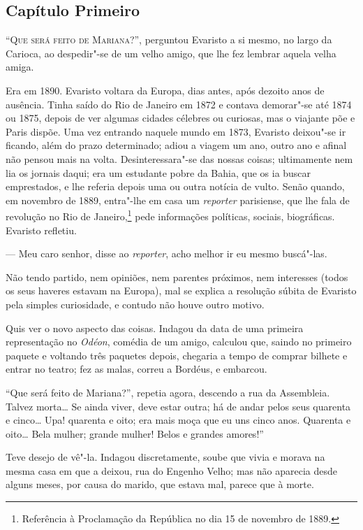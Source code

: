 \begin{linenumbers}

\section{Capítulo Primeiro}

\textsc{``Que será feito de Mariana?'',} perguntou Evaristo a si mesmo, no largo
da Carioca, ao despedir"-se de um velho amigo, que lhe fez lembrar aquela
velha amiga.

Era em 1890. Evaristo voltara da Europa, dias antes, após dezoito anos
de ausência. Tinha saído do Rio de Janeiro em 1872 e contava demorar"-se
até 1874 ou 1875, depois de ver algumas cidades célebres ou curiosas,
mas o viajante põe e Paris dispõe. Uma vez entrando naquele mundo em
1873, Evaristo deixou"-se ir ficando, além do prazo determinado; adiou a
viagem um ano, outro ano e afinal não pensou mais na volta.
Desinteressara"-se das nossas coisas; ultimamente nem lia os jornais
daqui; era um estudante pobre da Bahia, que os ia buscar emprestados, e
lhe referia depois uma ou outra notícia de vulto. Senão quando, em
novembro de 1889, entra"-lhe em casa um \emph{reporter} parisiense, que
lhe fala de revolução no Rio de Janeiro,\footnote{Referência à
  Proclamação da República no dia 15 de novembro de 1889.} pede
informações políticas, sociais, biográficas. Evaristo refletiu.

--- Meu caro senhor, disse ao \emph{reporter}, acho melhor ir eu mesmo
buscá"-las.

Não tendo partido, nem opiniões, nem parentes próximos, nem interesses
(todos os seus haveres estavam na Europa), mal se explica a resolução
súbita de Evaristo pela simples curiosidade, e contudo não houve outro
motivo.

Quis ver o novo aspecto das coisas. Indagou da data de uma primeira
representação no \emph{Odéon}, comédia de um amigo, calculou que, saindo
no primeiro paquete e voltando três paquetes depois, chegaria a tempo de
comprar bilhete e entrar no teatro; fez as malas, correu a Bordéus, e
embarcou.

``Que será feito de Mariana?'', repetia agora, descendo a rua da
Assembleia. Talvez morta\ldots{} Se ainda viver, deve estar outra; há de
andar pelos seus quarenta e cinco\ldots{} Upa! quarenta e oito; era mais moça
que eu uns cinco anos. Quarenta e oito\ldots{} Bela mulher; grande mulher!
Belos e grandes amores!''

Teve desejo de vê"-la. Indagou discretamente, soube que vivia e morava na
mesma casa em que a deixou, rua do Engenho Velho; mas não aparecia desde
alguns meses, por causa do marido, que estava mal, parece que à morte.


\end{linenumbers}
